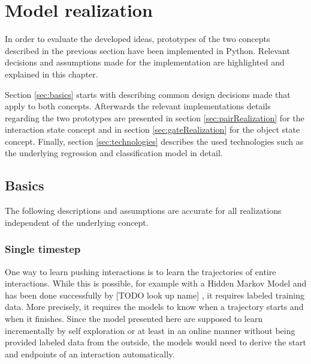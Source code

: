 \chapter{Model realization\label{chap:modelReal}}



In order to evaluate the developed ideas, prototypes of the two concepts described in the previous section have been implemented in Python. Relevant decisions and assumptions made for the implementation are highlighted and explained in this chapter. 

Section \ref{sec:basics} starts with describing common design decisions made that apply to both concepts. Afterwards the relevant implementations details regarding the two prototypes are presented in section \ref{sec:pairRealization} for the interaction state concept and in section \ref{sec:gateRealization} for the object state concept. Finally, section \ref{sec:technologies} describes the used technologies such as the underlying regression and classification model in detail.

\section{Basics \label{sec:basics}}

The following descriptions and assumptions are accurate for all realizations independent of the underlying concept.

\subsection{Single timestep}

One way to learn pushing interactions is to learn the trajectories of entire interactions. While this is possible, for example with a Hidden Markov Model \cite{hmm} and has been done successfully by [TODO look up name] \cite{hmmTrajectory}, it requires labeled training data. More precisely, it requires the models to know when a trajectory starts and when it finishes. Since the model presented here are supposed to learn incrementally by self exploration or at least in an online manner without being provided labeled data from the outside, the models would need to derive the start and endpoints of an interaction automatically. 

